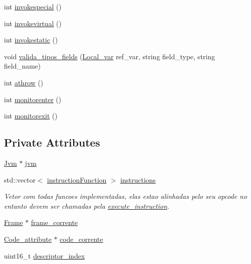 \begin{DoxyCompactItemize}
\item 
int \hyperlink{classInterpretador_af1af18d5c72e72c8ccee52c83d3e4160}{invokespecial} ()
\item 
int \hyperlink{classInterpretador_af0c061608e03b8d89a493a1b9cb9d4b4}{invokevirtual} ()
\item 
int \hyperlink{classInterpretador_af6589e2dbd6fa8c03aa6134f77db52e3}{invokestatic} ()
\item 
void \hyperlink{classInterpretador_a84a3dd88cffca0a80bfbafb2453c9866}{valida\+\_\+tipos\+\_\+fields} (\hyperlink{classLocal__var}{Local\+\_\+var} ref\+\_\+var, string field\+\_\+type, string field\+\_\+name)
\item 
int \hyperlink{classInterpretador_ab7446cc6b524369b63e573b634985c6b}{athrow} ()
\item 
int \hyperlink{classInterpretador_aab511f1c7db0899ae54ca1e61b1e4d56}{monitorenter} ()
\item 
int \hyperlink{classInterpretador_aefbc157baa70b4f8477b1fda90e6fca5}{monitorexit} ()
\end{DoxyCompactItemize}
\subsection*{Private Attributes}
\begin{DoxyCompactItemize}
\item 
\hyperlink{classJvm}{Jvm} $\ast$ \hyperlink{classInterpretador_aed3bd481ff345333414aa70360a94b7c}{jvm}
\item 
std\+::vector$<$ \hyperlink{classInterpretador_a0c7f1073259b205ff698b95db287e713}{instruction\+Function} $>$ \hyperlink{classInterpretador_a97cef3f8602b524716643a0395da46fe}{instructions}
\begin{DoxyCompactList}\small\item\em Vetor com todas funcoes implementadas, elas estao alinhadas pelo seu opcode no entanto devem ser chamadas pela \hyperlink{classInterpretador_a2bec82447756b2f6a43e68164ddbdde1}{execute\+\_\+instruction}. \end{DoxyCompactList}\item 
\hyperlink{classFrame}{Frame} $\ast$ \hyperlink{classInterpretador_a045818aa2a3f530ffb516d2bceac55a8}{frame\+\_\+corrente}
\item 
\hyperlink{attributes_8hpp_ad1d2692bc09d9023430faad186e7647e}{Code\+\_\+attribute} $\ast$ \hyperlink{classInterpretador_adc0e318d8cf9188ef597daeef754c1b9}{code\+\_\+corrente}
\item 
uint16\+\_\+t \hyperlink{classInterpretador_a1689e627d6bbc165db98b1c3df67fc60}{descriptor\+\_\+index}
\end{DoxyCompactItemize}


